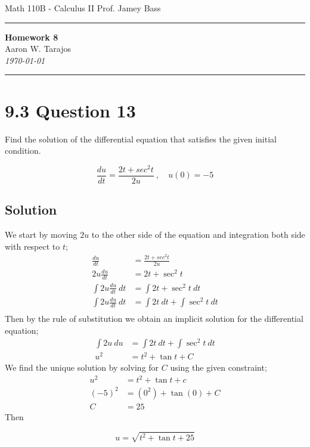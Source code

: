 \documentclass{article}
\begin{document}
\noindent
Math 110B - Calculus II  \hfill Prof. Jamey Bass

\noindent\rule{\textwidth}{0.4pt}

\begin{center}
    \textbf{\LARGE Homework 8} \\
    \vspace{12pt}
    \large Aaron W. Tarajos \\
    \textit{\today}
\end{center}

\noindent\rule{\textwidth}{0.4pt}

\section*{9.3 Question 13}
Find the solution of the differential equation that satisfies the given initial condition.

\[
	\frac{du}{dt} = \frac{2t + sec^2 t}{2u} \ , \quad u(0)=-5
\]

\subsection*{Solution}
We start by moving $2u$ to the other side of the equation and integration both side with respect to $t$;
\begin{align*}
	\frac{du}{dt} &= \frac{2t + sec^2 t}{2u} \\
	2u \frac{du}{dt} &= 2t + \sec^2 t \\
	\int 2u \frac{du}{dt}\ dt &= \int 2t + \sec^2 t \ dt \\
	\int 2u \frac{du}{dt}\ dt &= \int 2t \ dt + \int \sec^2 t \ dt \\
\end{align*}
Then by the rule of substitution we obtain an implicit solution for the differential equation;
\begin{align*}
	\int 2u \ du &= \int 2t \ dt + \int \sec^2 t \ dt \\
	u^2 &= t^2 + \tan t + C
\end{align*}
We find the unique solution by solving for $C$ using the given constraint;
\begin{align*}
	u^2 &= t^2 + \tan t + c \\
	(-5)^2 &= (0^2) + \tan(0) + C \\
	C &= 25
\end{align*}
Then

\[
	\boxed{u = \sqrt{t^2 + \tan t + 25}}
\]
\end{document}
